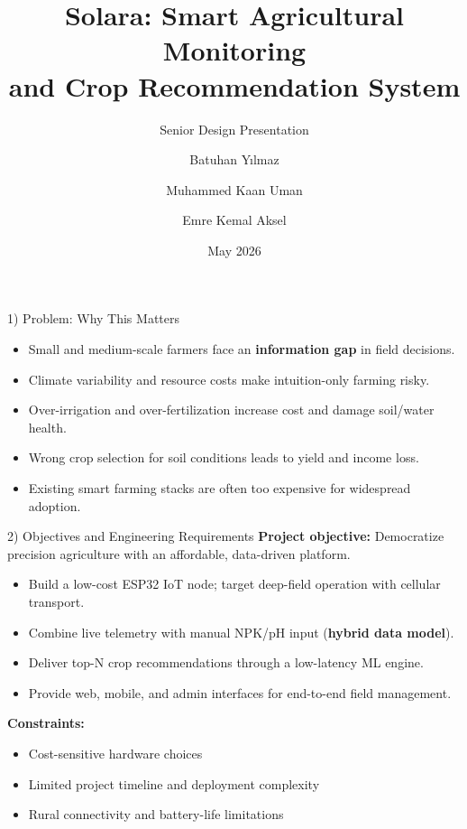 \documentclass[aspectratio=169]{beamer}
\title[Solara]{Solara: Smart Agricultural Monitoring\\and Crop Recommendation System}
\subtitle{Senior Design Presentation}
\author{Batuhan Y\i lmaz \and Muhammed Kaan Uman \and Emre Kemal Aksel}
\institute{Akdeniz University, Computer Engineering}
\date{May 2026}
\begin{document}
\begin{frame}
  \titlepage
\end{frame}

\begin{frame}{1) Problem: Why This Matters}
  \begin{itemize}
    \item Small and medium-scale farmers face an \textbf{information gap} in field decisions.
    \item Climate variability and resource costs make intuition-only farming risky.
    \item Over-irrigation and over-fertilization increase cost and damage soil/water health.
    \item Wrong crop selection for soil conditions leads to yield and income loss.
    \item Existing smart farming stacks are often too expensive for widespread adoption.
  \end{itemize}
\end{frame}

\begin{frame}{2) Objectives and Engineering Requirements}
  \textbf{Project objective:} Democratize precision agriculture with an affordable, data-driven platform.
  \vspace{0.5em}
  \begin{itemize}
    \item Build a low-cost ESP32 IoT node; target deep-field operation with cellular transport.
    \item Combine live telemetry with manual NPK/pH input (\textbf{hybrid data model}).
    \item Deliver top-N crop recommendations through a low-latency ML engine.
    \item Provide web, mobile, and admin interfaces for end-to-end field management.
  \end{itemize}
  \vspace{0.5em}
  \textbf{Constraints:}
  \begin{itemize}
    \item Cost-sensitive hardware choices
    \item Limited project timeline and deployment complexity
    \item Rural connectivity and battery-life limitations
  \end{itemize}
\end{frame}
\end{document}
